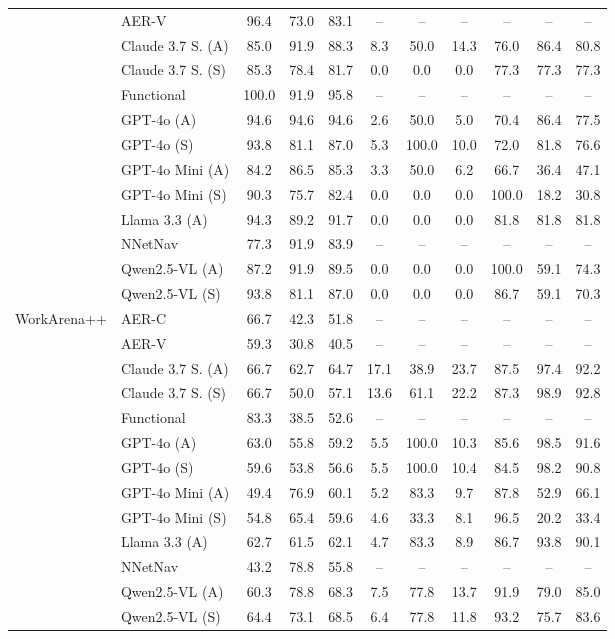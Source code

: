 \begin{tabular}{ll @{\hskip 15pt} ccc @{\hskip 20pt} ccc @{\hskip 20pt} ccc}
 & AER-V & 96.4 & 73.0 & 83.1 & -- & -- & -- & -- & -- & -- \\
 & Claude 3.7 S. (A) & 85.0 & 91.9 & 88.3 & 8.3 & 50.0 & 14.3 & 76.0 & 86.4 & 80.8 \\
 & Claude 3.7 S. (S) & 85.3 & 78.4 & 81.7 & 0.0 & 0.0 & 0.0 & 77.3 & 77.3 & 77.3 \\
 & Functional & 100.0 & 91.9 & 95.8 & -- & -- & -- & -- & -- & -- \\
 & GPT-4o (A) & 94.6 & 94.6 & 94.6 & 2.6 & 50.0 & 5.0 & 70.4 & 86.4 & 77.5 \\
 & GPT-4o (S) & 93.8 & 81.1 & 87.0 & 5.3 & 100.0 & 10.0 & 72.0 & 81.8 & 76.6 \\
 & GPT-4o Mini (A) & 84.2 & 86.5 & 85.3 & 3.3 & 50.0 & 6.2 & 66.7 & 36.4 & 47.1 \\
 & GPT-4o Mini (S) & 90.3 & 75.7 & 82.4 & 0.0 & 0.0 & 0.0 & 100.0 & 18.2 & 30.8 \\
 & Llama 3.3 (A) & 94.3 & 89.2 & 91.7 & 0.0 & 0.0 & 0.0 & 81.8 & 81.8 & 81.8 \\
 & NNetNav & 77.3 & 91.9 & 83.9 & -- & -- & -- & -- & -- & -- \\
 & Qwen2.5-VL (A) & 87.2 & 91.9 & 89.5 & 0.0 & 0.0 & 0.0 & 100.0 & 59.1 & 74.3 \\
 & Qwen2.5-VL (S) & 93.8 & 81.1 & 87.0 & 0.0 & 0.0 & 0.0 & 86.7 & 59.1 & 70.3 \\
\midrule
\multirow[*]{13}{*}{WorkArena++} & AER-C & 66.7 & 42.3 & 51.8 & -- & -- & -- & -- & -- & -- \\
 & AER-V & 59.3 & 30.8 & 40.5 & -- & -- & -- & -- & -- & -- \\
 & Claude 3.7 S. (A) & 66.7 & 62.7 & 64.7 & 17.1 & 38.9 & 23.7 & 87.5 & 97.4 & 92.2 \\
 & Claude 3.7 S. (S) & 66.7 & 50.0 & 57.1 & 13.6 & 61.1 & 22.2 & 87.3 & 98.9 & 92.8 \\
 & Functional & 83.3 & 38.5 & 52.6 & -- & -- & -- & -- & -- & -- \\
 & GPT-4o (A) & 63.0 & 55.8 & 59.2 & 5.5 & 100.0 & 10.3 & 85.6 & 98.5 & 91.6 \\
 & GPT-4o (S) & 59.6 & 53.8 & 56.6 & 5.5 & 100.0 & 10.4 & 84.5 & 98.2 & 90.8 \\
 & GPT-4o Mini (A) & 49.4 & 76.9 & 60.1 & 5.2 & 83.3 & 9.7 & 87.8 & 52.9 & 66.1 \\
 & GPT-4o Mini (S) & 54.8 & 65.4 & 59.6 & 4.6 & 33.3 & 8.1 & 96.5 & 20.2 & 33.4 \\
 & Llama 3.3 (A) & 62.7 & 61.5 & 62.1 & 4.7 & 83.3 & 8.9 & 86.7 & 93.8 & 90.1 \\
 & NNetNav & 43.2 & 78.8 & 55.8 & -- & -- & -- & -- & -- & -- \\
 & Qwen2.5-VL (A) & 60.3 & 78.8 & 68.3 & 7.5 & 77.8 & 13.7 & 91.9 & 79.0 & 85.0 \\
 & Qwen2.5-VL (S) & 64.4 & 73.1 & 68.5 & 6.4 & 77.8 & 11.8 & 93.2 & 75.7 & 83.6 \\
\bottomrule
\end{tabular}
